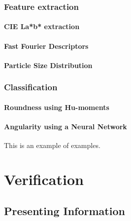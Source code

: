 \documentclass[11pt,fleqn,,a4paper,twoside,openright]{book}
\begin{document}
\section{Feature extraction}\label{Segmentation}


\subsection{CIE La*b* extraction}\label{CIELab}


\subsection{Fast Fourier Descriptors}\label{FFT}

\subsection{Particle Size Distribution}


\section{Classification}

\subsection{Roundness using Hu-moments} \label{HuMoments}

\subsection{Angularity using a Neural Network} \label{NeuralNet}


This is an example of examples.

\part{Verification}


\chapter{Presenting Information}
\end{document}
